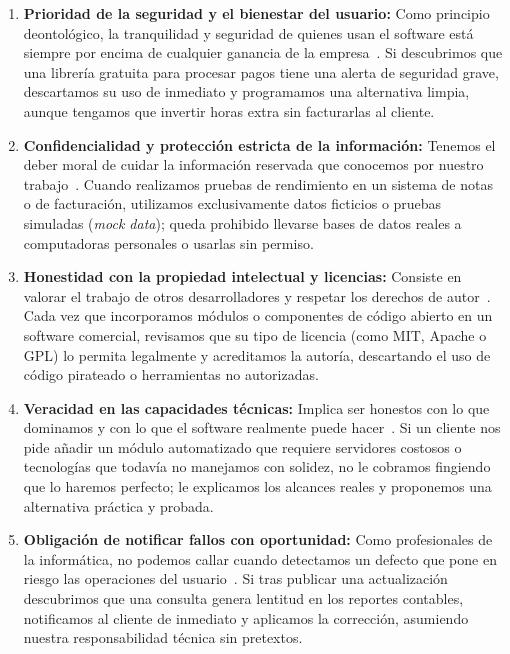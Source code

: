 \documentclass[12pt,a4paper,oneside]{article}
\begin{document}
\begin{enumerate}[leftmargin=1.8em,itemsep=4pt]
    \item \textbf{Prioridad de la seguridad y el bienestar del usuario:} Como principio deontológico, la tranquilidad y seguridad de quienes usan el software está siempre por encima de cualquier ganancia de la empresa~\cite{acm2018,ieee2020}. Si descubrimos que una librería gratuita para procesar pagos tiene una alerta de seguridad grave, descartamos su uso de inmediato y programamos una alternativa limpia, aunque tengamos que invertir horas extra sin facturarlas al cliente.

    \item \textbf{Confidencialidad y protección estricta de la información:} Tenemos el deber moral de cuidar la información reservada que conocemos por nuestro trabajo~\cite{gotterbarn2001}. Cuando realizamos pruebas de rendimiento en un sistema de notas o de facturación, utilizamos exclusivamente datos ficticios o pruebas simuladas (\textit{mock data}); queda prohibido llevarse bases de datos reales a computadoras personales o usarlas sin permiso.

    \item \textbf{Honestidad con la propiedad intelectual y licencias:} Consiste en valorar el trabajo de otros desarrolladores y respetar los derechos de autor~\cite{acm2018,gotterbarn2001}. Cada vez que incorporamos módulos o componentes de código abierto en un software comercial, revisamos que su tipo de licencia (como MIT, Apache o GPL) lo permita legalmente y acreditamos la autoría, descartando el uso de código pirateado o herramientas no autorizadas.

    \item \textbf{Veracidad en las capacidades técnicas:} Implica ser honestos con lo que dominamos y con lo que el software realmente puede hacer~\cite{ieee2020,sommerville2011}. Si un cliente nos pide añadir un módulo automatizado que requiere servidores costosos o tecnologías que todavía no manejamos con solidez, no le cobramos fingiendo que lo haremos perfecto; le explicamos los alcances reales y proponemos una alternativa práctica y probada.

    \item \textbf{Obligación de notificar fallos con oportunidad:} Como profesionales de la informática, no podemos callar cuando detectamos un defecto que pone en riesgo las operaciones del usuario~\cite{gotterbarn2001}. Si tras publicar una actualización descubrimos que una consulta genera lentitud en los reportes contables, notificamos al cliente de inmediato y aplicamos la corrección, asumiendo nuestra responsabilidad técnica sin pretextos.
\end{enumerate}
\end{document}

